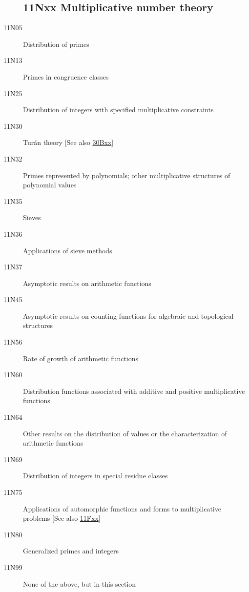 \begin{description}
\subsection*{11Nxx  Multiplicative number theory }\label{11Nxx}
\item [11N05]\label{11N05} Distribution of primes
\item [11N13]\label{11N13} Primes in congruence classes
\item [11N25]\label{11N25} Distribution of integers with specified multiplicative constraints
\item [11N30]\label{11N30} Tur\'{a}n theory [See also \hyperref[30Bxx]{30Bxx}]
\item [11N32]\label{11N32} Primes represented by polynomials; other multiplicative structures of polynomial values
\item [11N35]\label{11N35} Sieves
\item [11N36]\label{11N36} Applications of sieve methods
\item [11N37]\label{11N37} Asymptotic results on arithmetic functions
\item [11N45]\label{11N45} Asymptotic results on counting functions for algebraic and topological structures
\item [11N56]\label{11N56} Rate of growth of arithmetic functions
\item [11N60]\label{11N60} Distribution functions associated with additive and positive multiplicative functions
\item [11N64]\label{11N64} Other results on the distribution of values or the characterization of arithmetic functions
\item [11N69]\label{11N69} Distribution of integers in special residue classes
\item [11N75]\label{11N75} Applications of automorphic functions and forms to multiplicative problems [See also \hyperref[11Fxx]{11Fxx}]
\item [11N80]\label{11N80} Generalized primes and integers
\item [11N99]\label{11N99} None of the above, but in this section
\end{description}
